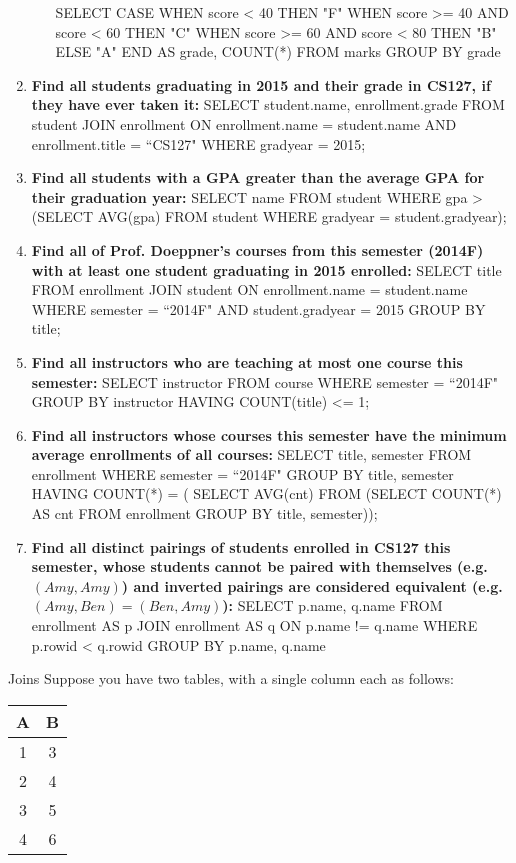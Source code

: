 \documentclass[2pt,letter]{scrartcl}
\makeatletter
\renewcommand{\section}{\@startsection{section}{1}{0mm}
  {-1ex plus -.5ex minus -.2ex}
  {0.5ex plus .2ex}
{\normalfont\large\bfseries}}
\makeatother
\begin{document}
\begin{multicols}{3}
\begin{enumerate}
\begin{itemize}
						SELECT CASE WHEN score < 40 THEN "F" WHEN score >= 40 AND score < 60 THEN "C" WHEN score >= 60 AND score < 80 THEN "B" ELSE "A" END AS grade, COUNT(*) FROM marks GROUP BY grade
				\end{itemize}
			\item {\bf Find all students graduating in 2015 and their grade in CS127, if they have ever taken it: } SELECT student.name, enrollment.grade FROM student JOIN enrollment ON enrollment.name = student.name AND enrollment.title = ``CS127" WHERE gradyear = 2015;
			\item {\bf Find all students with a GPA greater than the average GPA for their graduation year: } SELECT name FROM student WHERE gpa > (SELECT AVG(gpa) FROM student WHERE gradyear = student.gradyear);
			\item {\bf Find all of Prof. Doeppner's courses from this semester (2014F) with at least one student graduating in 2015 enrolled: } SELECT title FROM enrollment
JOIN student ON enrollment.name = student.name
WHERE semester = ``2014F" AND student.gradyear = 2015
GROUP BY title;
			\item {\bf Find all instructors who are teaching at most one course this semester: } SELECT instructor FROM course
WHERE semester = ``2014F"
GROUP BY instructor
HAVING COUNT(title) <= 1;
			\item {\bf Find all instructors whose courses this semester have the minimum average enrollments of all courses: }SELECT title, semester FROM enrollment 
WHERE semester = ``2014F"
GROUP BY title, semester
HAVING COUNT(*) = (
SELECT AVG(cnt) FROM (SELECT COUNT(*) AS cnt FROM enrollment
GROUP BY title, semester));
			\item {\bf Find all distinct pairings of students enrolled in CS127 this semester, whose students cannot be paired with themselves (e.g. $(Amy, Amy)$) and inverted pairings are considered equivalent (e.g. $(Amy, Ben) = (Ben, Amy)$): } SELECT p.name, q.name FROM enrollment AS p  JOIN enrollment AS q ON p.name != q.name WHERE p.rowid < q.rowid GROUP BY p.name, q.name				
			\end{enumerate}
	 
  \section{Joins}
  	Suppose you have two tables, with a single column each as follows:
	
	\begin{tabular}{|c|c|}
		\hline
		A & B \\
		\hline
		1 & 3 \\
		2 & 4 \\
		3 & 5 \\
		4 & 6 \\
		\hline
	\end{tabular}
	

\end{multicols}
\end{document}
